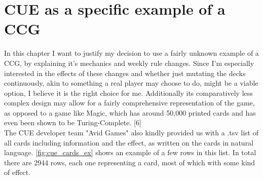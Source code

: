 \section{CUE as a specific example of a CCG}
\label{sec:background:cue}
In this chapter I want to justify my decision to use a fairly unknown example of a \ac{CCG}, by explaining it’s mechanics and weekly rule changes. Since I’m especially interested in the effects of these changes and whether just mutating the decks continuously, akin to something a real player may choose to do, might be a viable option, I believe it is the right choice for me. Additionally its comparatively less complex design may allow for a fairly comprehensive representation of the game, as opposed to a game like Magic, which has around 50,000 printed cards and has even been shown to be Turing-Complete. [6] \\
The CUE developer team "Avid Games" also kindly provided us with a .tsv list of all cards including information and the effect, as written on the cards in natural language. \ref{fig:cue_cards_ex} shows an example of a few rows in this list. In total there are 2944 rows, each one representing a card, most of which with some kind of effect. \\

